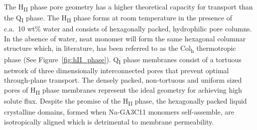 \documentclass[journal=jpcbfk,manusciprt=article]{achemso}
\begin{document}
  The H\textsubscript{II} phase pore geometry has a higher theoretical capacity
  for transport than the Q\textsubscript{I} phase. The H\textsubscript{II} phase forms
  at room temperature in the presence of c.a.~10 wt\% water and consists of hexagonally
  packed, hydrophilic pore columns\cite{smith_ordered_1997}. In the absence of
  water, neat monomer will form the same hexagonal columnar structure which, in
  literature, has been referred to as the Col\textsubscript{h} thermotropic
  phase\cite{feng_scalable_2014} (See Figure~\ref{fig:hII_phase}). 
  Q\textsubscript{I} phase membranes consist of a tortuous network of three dimensionally 
  interconnected pores that prevent optimal through-plane transport. The densely packed, 
  non-tortuous and uniform sized pores of H\textsubscript{II} phase membranes represent
  the ideal geometry for achieving high solute flux\cite{matyka_tortuosity-porosity_2008}.
  Despite the promise of the H\textsubscript{II} phase, the hexagonally packed
  liquid crystalline domains, formed when Na-GA3C11 monomers self-assemble, are
  isotropically aligned which is detrimental to membrane permeability. 

\end{document}
